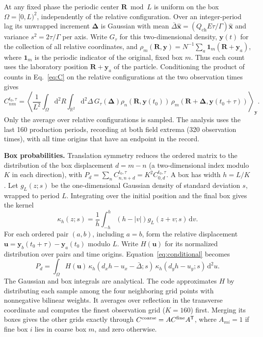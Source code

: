 \documentclass[11pt,letterpaper]{article}
\newcommand{\ch}{Q_{\mathrm{ch}}}
\newcommand{\ex}{\hat{\mathbf x}}
\newcommand{\dd}{\mathrm d}
\begin{document}
At any fixed phase the periodic center $\mathbf R\bmod L$ is uniform on the box
$\Omega=[0,L)^2$, independently of the relative configuration. Over an integer-period lag
its unwrapped increment $\boldsymbol\Delta$ is Gaussian with mean
$\bar\Delta\ex=(\ch E\tau/\Gamma)\ex$ and variance $s^2=2\tau/\Gamma$ per axis.
Write $G_\tau$ for this two-dimensional density, $\mathbf y(t)$ for the collection
of all relative coordinates, and
$\rho_m(\mathbf R,\mathbf y)=N^{-1}\sum_a\mathbf 1_m(\mathbf R+\mathbf y_a)$,
where $\mathbf 1_m$ is the periodic indicator of the original, fixed box $m$. Thus each count uses the laboratory position
$\mathbf R+\mathbf y_a$ of the particle. Conditioning the product of counts in Eq.~\eqref{eq:C}
on the relative configurations at the two observation times gives
\begin{equation}
 C^{t_0,\tau}_{nm} =
 \left\langle \frac{1}{L^2}\int_\Omega\dd^2 R
 \int_{\mathbb R^2}\dd^2\Delta\,G_\tau(\boldsymbol\Delta)
 \rho_n(\mathbf R,\mathbf y(t_0))\,
 \rho_m(\mathbf R+\boldsymbol\Delta,\mathbf y(t_0+\tau))\right\rangle_{\mathbf y}.
 \label{eq:conditional}
\end{equation}
Only the average over relative configurations is sampled. The analysis uses the last 160 production
periods, recording at both field extrema (320 observation times), with all time origins that have an endpoint
in the record.

\textbf{Box probabilities.}
Translation symmetry reduces the ordered matrix to the distribution of the box displacement
$d=m-n$ (a two-dimensional index modulo $K$ in each direction), with
$P_d=\sum_n C^{t_0,\tau}_{n,n+d}=K^2 C^{t_0,\tau}_{0,d}$. A box has width $h=L/K$.
Let $g_L(z;s)$ be the one-dimensional Gaussian density of standard deviation $s$, wrapped
to period $L$. Integrating over the initial position and the final box gives the kernel
\begin{equation}
 \kappa_h(z;s)=\frac1h\int_{-h}^h(h-|v|)g_L(z+v;s)\,\dd v .
\end{equation}
For each ordered pair $(a,b)$, including $a=b$, form the relative displacement
$\mathbf u=\mathbf y_b(t_0+\tau)-\mathbf y_a(t_0)$ modulo $L$. Write $H(\mathbf u)$
for its normalized distribution over pairs and time origins. Equation~\eqref{eq:conditional} becomes
\begin{equation}
 P_d=\int_{\Omega}H(\mathbf u)\,
 \kappa_h(d_xh-u_x-\bar\Delta;s)\,\kappa_h(d_yh-u_y;s)\,\dd^2u.
\end{equation}
The Gaussian and box integrals are analytical. The code approximates $H$ by distributing
each sample among the four neighboring grid points with nonnegative bilinear weights.
It averages over reflection in the transverse coordinate and computes the finest observation
grid ($K=160$) first. Merging its boxes gives the other grids exactly through
$C^{\rm coarse}=A C^{\rm fine}A^{\mathsf T}$, where $A_{mi}=1$ if fine box $i$ lies in
coarse box $m$, and zero otherwise.
\end{document}
